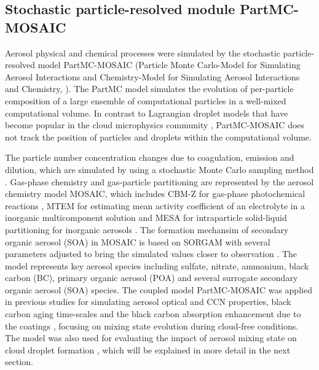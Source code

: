 \documentclass[edeposit,fullpage]{uiucthesis2009}
\begin{document}
\subsection{Stochastic particle-resolved module PartMC-MOSAIC}
Aerosol physical and chemical processes were simulated by the
stochastic particle-resolved model PartMC-MOSAIC (Particle Monte
Carlo-Model for Simulating Aerosol Interactions and Chemistry-Model
for Simulating Aerosol Interactions and Chemistry, \citep{Riemer2009,
  Zaveri2008}). The PartMC model simulates the evolution of
per-particle composition of a large ensemble of computational
particles in a well-mixed computational volume. In contrast to
Lagrangian droplet models that have become popular in the cloud
microphysics community \citep{Shima2009,Grabowski2019}, PartMC-MOSAIC
does not track the position of particles and droplets within the
computational volume.

The particle number concentration changes due to coagulation, emission
and dilution, which are simulated by using a stochastic Monte Carlo
sampling method \citep{Riemer2009}. Gas-phase chemistry and
gas-particle partitioning are represented by the aerosol chemistry
model MOSAIC, which includes CBM-Z for gas-phase photochemical
reactions \citep{Zaveri1999}, MTEM for estimating mean activity
coefficient of an electrolyte in a inorganic multicomponent solution
\citep{Zaveri2005} and MESA for intraparticle solid-liquid
partitioning for inorganic aerosols \citep{Zaveri2005a}. The formation
mechansim of secondary organic aerosol (SOA) in MOSAIC is based on
SORGAM \citep{Schell2001} with several parameters adjusted to bring the
simulated values closer to observation \citep{Zaveri2010a}. The model
represents key aerosol species including sulfate, nitrate, ammonium,
black carbon (BC), primary organic aerosol (POA) and several surrogate
secondary organic aerosol (SOA) species. The coupled model
PartMC-MOSAIC was applied in previous studies for simulating aerosol
optical and CCN properties, black carbon aging time-scales and the
black carbon absorption enhancement due to the coatings
\citep{Zaveri2010a, Riemer2010, Fierce2017,Fierce2020}, focusing on
mixing state evolution during cloud-free conditions. The model was
also used for evaluating the impact of aerosol mixing state on cloud
droplet formation \citep{ching2012impacts,Ching2016}, which will be explained
in more detail in the next section.
\end{document}
